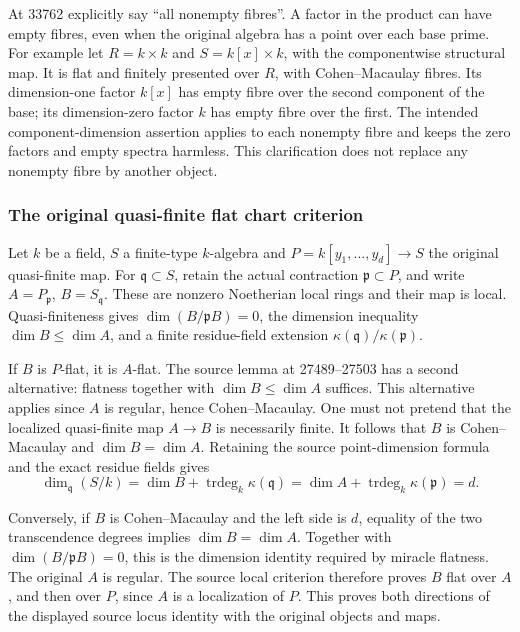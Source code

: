 At 33762 explicitly say ``all nonempty fibres''. A factor in the product can have empty fibres, even when the original algebra has a point over each base prime. For example let \(R=k\times k\) and \(S=k[x]\times k\), with the componentwise structural map. It is flat and finitely presented over \(R\), with Cohen--Macaulay fibres. Its dimension-one factor \(k[x]\) has empty fibre over the second component of the base; its dimension-zero factor \(k\) has empty fibre over the first. The intended component-dimension assertion applies to each nonempty fibre and keeps the zero factors and empty spectra harmless. This clarification does not replace any nonempty fibre by another object.

\subsubsection{The original quasi-finite flat chart criterion}\label{algebra-proof-040-the-original-quasi-finite-flat-chart-criterion}

Let \(k\) be a field, \(S\) a finite-type \(k\)-algebra and \(P=k[y_1,\ldots,y_d]\to S\) the original quasi-finite map. For \(\mathfrak q\subset S\), retain the actual contraction \(\mathfrak p\subset P\), and write \(A=P_{\mathfrak p}\), \(B=S_{\mathfrak q}\). These are nonzero Noetherian local rings and their map is local. Quasi-finiteness gives \(\dim(B/\mathfrak pB)=0\), the dimension inequality \(\dim B\leq\dim A\), and a finite residue-field extension \(\kappa(\mathfrak q)/\kappa(\mathfrak p)\).

If \(B\) is \(P\)-flat, it is \(A\)-flat. The source lemma at 27489--27503 has a second alternative: flatness together with \(\dim B\leq\dim A\) suffices. This alternative applies since \(A\) is regular, hence Cohen--Macaulay. One must not pretend that the localized quasi-finite map \(A\to B\) is necessarily finite. It follows that \(B\) is Cohen--Macaulay and \(\dim B=\dim A\). Retaining the source point-dimension formula and the exact residue fields gives \[
\dim_{\mathfrak q}(S/k)
=\dim B+\operatorname{trdeg}_k\kappa(\mathfrak q)
=\dim A+\operatorname{trdeg}_k\kappa(\mathfrak p)=d.
\]

Conversely, if \(B\) is Cohen--Macaulay and the left side is \(d\), equality of the two transcendence degrees implies \(\dim B=\dim A\). Together with \(\dim(B/\mathfrak pB)=0\), this is the dimension identity required by miracle flatness. The original \(A\) is regular. The source local criterion therefore proves \(B\) flat over \(A\), and then over \(P\), since \(A\) is a localization of \(P\). This proves both directions of the displayed source locus identity with the original objects and maps.

